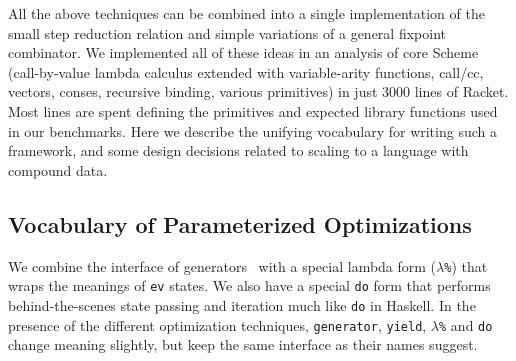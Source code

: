 \documentclass[preprint,onecolumn,9pt]{sigplanconf} %
\begin{document}
All the above techniques can be combined into a single implementation
of the small step reduction relation and simple variations of a
general fixpoint combinator. We implemented all of these ideas in an
analysis of core Scheme (call-by-value lambda calculus extended with
variable-arity functions, call/cc, vectors, conses, recursive binding,
various primitives) in just 3000 lines of Racket. Most lines are spent
defining the primitives and expected library functions used in our
benchmarks. Here we describe the unifying vocabulary for writing such
a framework, and some design decisions related to scaling to a
language with compound data.

\subsection{Vocabulary of Parameterized Optimizations}

We combine the interface of generators~\cite{ianjohnson:cluhistory}
with a special lambda form ({\tt $\lambda$\%}) that wraps the meanings
of {\tt ev} states. We also have a special {\tt do} form that performs
behind-the-scenes state passing and iteration much like {\tt do} in
Haskell. In the presence of the different optimization
techniques, {\tt generator}, {\tt yield}, {\tt $\lambda$\%} and {\tt do}
change meaning slightly, but keep the same interface as their names
suggest.
\end{document}
